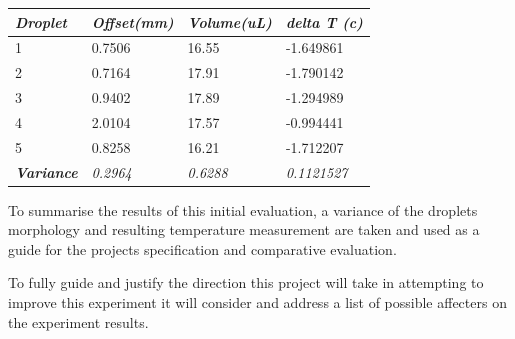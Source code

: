 \begin{table}[h]
    \centering
    \begin{tabular}{|l|l|l|l|}
        \hline
        \textit{\textbf{Droplet}}                          & \textit{Offset(mm)} & \textit{Volume(uL)} & \textit{delta T (c)}\\ \hline
        \cellcolor[HTML]{9698ED}1                          & 0.7506              & 16.55               &  -1.649861        \\ \hline
        \cellcolor[HTML]{E9AD3F}2                          & 0.7164              & 17.91               &  -1.790142        \\ \hline
        \cellcolor[HTML]{C0C0C0}3                          & 0.9402              & 17.89               &  -1.294989        \\ \hline
        \cellcolor[HTML]{FFFC9E}4                          & 2.0104              & 17.57               &  -0.994441        \\ \hline
        \cellcolor[HTML]{79CD5D}5                          & 0.8258              & 16.21               &  -1.712207        \\ \hline
        \cellcolor[HTML]{FFFFFF}\textbf{\textit{Variance}} & \textit{0.2964}     & \textit{0.6288}     &  \textit{0.1121527 }       \\ \hline
    \end{tabular}
\end{table}

To summarise the results of this initial evaluation, a variance of the droplets morphology and resulting temperature measurement are taken and used as a guide for the projects specification and comparative evaluation.    

To fully guide and justify the direction this project will take in attempting to improve this experiment it will consider and address a list of possible affecters on the experiment results.

